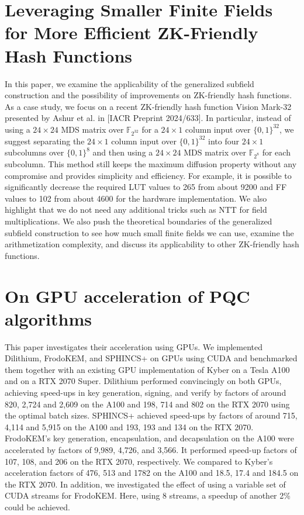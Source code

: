 \documentclass[11pt,oneside]{book}
\theoremstyle{definition}
\theoremstyle{remark}
\theoremstyle{plain}
\begin{document}
\section{\cite{cryptoeprint:2025/1593} Leveraging Smaller Finite Fields for More Efficient ZK-Friendly Hash Functions}
In this paper, we examine the applicability of the generalized subfield construction and the possibility of improvements on ZK-friendly hash functions. As a case study, we focus on a recent ZK-friendly hash function Vision Mark-32 presented by Ashur et al. in [IACR Preprint 2024/633]. In particular, instead of using a $24\times 24$ MDS matrix over $\mathbb{F}_{2^{32}}$ for a $24\times 1$ column input over $\{0,1\}^{{32}}$, we suggest separating the $24\times 1$ column input over $\{0,1\}^{{32}}$ into four $24\times 1$ subcolumns over $\{0,1\}^{{8}}$ and then using a $24\times 24$ MDS matrix over $\mathbb{F}_{2^8}$ for each subcolumn. This method still keeps the maximum diffusion property without any compromise and provides simplicity and efficiency. For example, it is possible to significantly decrease the required LUT values to 265 from about 9200 and FF values to 102 from about 4600 for the hardware implementation. We also highlight that we do not need any additional tricks such as NTT for field multiplications. We also push the theoretical boundaries of the generalized subfield construction to see how much small finite fields we can use, examine the arithmetization complexity, and discuss its applicability to other ZK-friendly hash functions.

\section{\cite{cryptoeprint:2025/1596} On GPU acceleration of PQC algorithms}
This paper investigates their acceleration using GPUs. We implemented Dilithium, FrodoKEM, and SPHINCS+ on GPUs using CUDA and benchmarked them together with an existing GPU implementation of Kyber on a Tesla A100 and on a RTX 2070 Super. Dilithium performed convincingly on both GPUs, achieving speed-ups in key generation, signing, and verify by factors of around 820, 2,724 and 2,609 on the A100 and 198, 714 and 802 on the RTX 2070 using the optimal batch sizes. SPHINCS+ achieved speed-ups by factors of around 715, 4,114 and 5,915 on the A100 and 193, 193 and 134 on the RTX 2070. FrodoKEM’s key generation, encapsulation, and decapsulation on the A100 were accelerated by factors of 9,989, 4,726, and 3,566. It performed speed-up factors of 107, 108, and 206 on the RTX 2070, respectively. We compared to Kyber's acceleration factors of 476, 513 and 1782 on the A100 and 18.5, 17.4 and 184.5 on the RTX 2070. In addition, we investigated the effect of using a variable set of CUDA streams for FrodoKEM. Here, using 8 streams, a speedup of another 2\% could be achieved.
\end{document}
